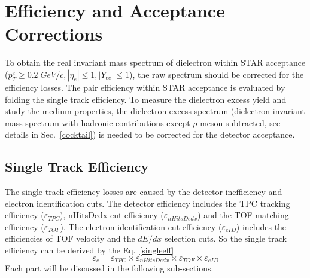\section{Efficiency and Acceptance Corrections}
To obtain the real invariant mass spectrum of dielectron within STAR acceptance ($p_{T}^{e} \geq 0.2\;GeV/c, |\eta_{e}| \leq 1, |Y_{ee}| \leq 1$), the raw spectrum should be corrected for the efficiency losses. The pair efficiency within STAR acceptance is evaluated by folding the single track efficiency. To measure the dielectron excess yield and study the medium properties, the dielectron excess spectrum (dielectron invariant mass spectrum with hadronic contributions except $\rho$-meson subtracted, see details in Sec.~\ref{cocktail}) is needed to be corrected for the detector acceptance.

\subsection{Single Track Efficiency}
\label{singletrkeff}
The single track efficiency losses are caused by the detector inefficiency and electron identification cuts. The detector efficiency includes the TPC tracking efficiency ($\varepsilon_{TPC}$), nHitsDedx cut efficiency ($\varepsilon_{nHitsDedx}$) and the TOF matching efficiency ($\varepsilon_{TOF}$). The electron identification cut efficiency ($\varepsilon_{eID}$) includes the efficiencies of TOF velocity and the $dE/dx$ selection cuts. So the single track efficiency can be derived by the Eq.~\ref{singleeff}
\begin{equation}
\varepsilon_{e} = \varepsilon_{TPC} \times \varepsilon_{nHitsDedx} \times \varepsilon_{TOF} \times \varepsilon_{eID}
\label{singleeff}
\end{equation}
Each part will be discussed in the following sub-sections.

